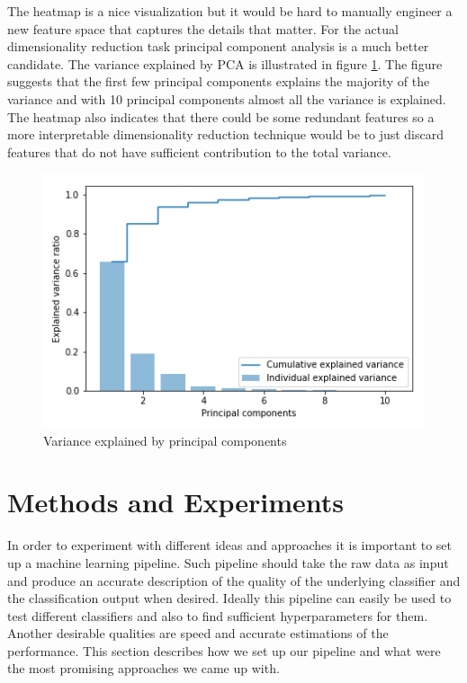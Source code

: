 \documentclass[fleqn,10pt]{SelfArx} %
\begin{document}
The heatmap is a nice visualization but it would be hard to manually engineer a
new feature space that captures the details that matter. For the actual
dimensionality reduction task principal component analysis is a much better
candidate.
The variance explained by PCA is illustrated in figure \ref{fig:pca}. The figure
suggests that the first few principal components explains the majority of the
variance and with 10 principal components almost all the variance is explained.
The heatmap also indicates that there could be some redundant
features so a more interpretable dimensionality reduction technique would be to
just discard features that do not have sufficient contribution to the total variance.

\begin{figure}[H]
  \includegraphics[width=\linewidth]{pca.png}
  \caption{Variance explained by principal components}
  \label{fig:pca}
\end{figure}

\section{Methods and Experiments} %

In order to experiment with different ideas and approaches it is important to
set up a machine learning pipeline. Such pipeline should take the raw data as input and produce
an accurate description of the quality of the underlying classifier and the
classification output when desired. Ideally this pipeline can easily be used to
test different classifiers and also to find sufficient hyperparameters for them.
Another desirable qualities are speed and accurate estimations of the
performance. This section describes how we set up our pipeline and what were the
most promising approaches we came up with.
\end{document}
